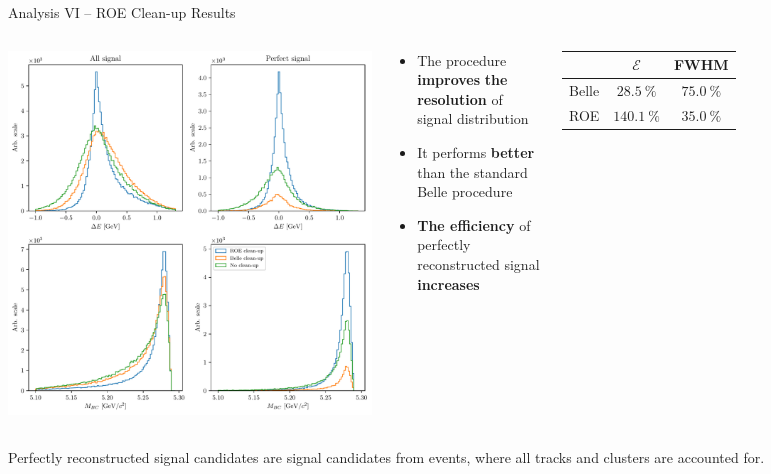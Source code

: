\documentclass[serif]{beamer}
\begin{document}
\begin{frame}[t]{Analysis VI -- ROE Clean-up Results}
\vspace{-3mm}
\small

\begin{columns}
	\includegraphics[width=\textwidth]{fig/roe_opt}
	\begin{block}{}
		\begin{itemize}
			\item The procedure \textbf{improves} \textbf{the resolution} of signal distribution
			\item It performs \textbf{better} than the standard Belle procedure
			\item \textbf{The efficiency} of perfectly reconstructed signal \textbf{increases}
		\end{itemize}
	\end{block}
\begin{table}[H]
	\centering
	\begin{tabular}{c|c|c}
		& $\mathcal{E}$ & FWHM\\
		\toprule
		Belle & $28.5~\%$  & $75.0~\%$  \\
		ROE & $140.1~\%$ & $35.0~\%$ \\
		\bottomrule
	\end{tabular}
\end{table}
\end{columns}

{\footnotesize Perfectly reconstructed signal candidates are signal candidates from events, where all tracks and clusters are accounted for.}


\end{frame}
\end{document}
